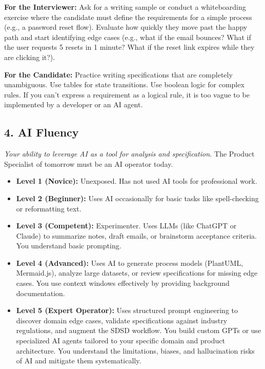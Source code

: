 \documentclass[
  11pt,
  openany,
  oneside]{book}
\providecommand{\tightlist}{%
  \setlength{\itemsep}{0pt}\setlength{\parskip}{0pt}}
\renewenvironment{quote}{\begin{customquote}}{\end{customquote}}
\begin{document}
\begin{quote}
\textbf{For the Interviewer:} Ask for a writing sample or conduct a
whiteboarding exercise where the candidate must define the requirements
for a simple process (e.g., a password reset flow). Evaluate how quickly
they move past the happy path and start identifying edge cases (e.g.,
what if the email bounces? What if the user requests 5 resets in 1
minute? What if the reset link expires while they are clicking it?).
\end{quote}

\begin{quote}
\textbf{For the Candidate:} Practice writing specifications that are
completely unambiguous. Use tables for state transitions. Use boolean
logic for complex rules. If you can't express a requirement as a logical
rule, it is too vague to be implemented by a developer or an AI agent.
\end{quote}

\subsection{4. AI Fluency}\label{ai-fluency}

\emph{Your ability to leverage AI as a tool for analysis and
specification.} The Product Specialist of tomorrow must be an AI
operator today.

\begin{itemize}
\tightlist
\item
  \textbf{Level 1 (Novice):} Unexposed. Has not used AI tools for
  professional work.
\item
  \textbf{Level 2 (Beginner):} Uses AI occasionally for basic tasks like
  spell-checking or reformatting text.
\item
  \textbf{Level 3 (Competent):} Experimenter. Uses LLMs (like ChatGPT or
  Claude) to summarize notes, draft emails, or brainstorm acceptance
  criteria. You understand basic prompting.
\item
  \textbf{Level 4 (Advanced):} Uses AI to generate process models
  (PlantUML, Mermaid.js), analyze large datasets, or review
  specifications for missing edge cases. You use context windows
  effectively by providing background documentation.
\item
  \textbf{Level 5 (Expert Operator):} Uses structured prompt engineering
  to discover domain edge cases, validate specifications against
  industry regulations, and augment the SDSD workflow. You build custom
  GPTs or use specialized AI agents tailored to your specific domain and
  product architecture. You understand the limitations, biases, and
  hallucination risks of AI and mitigate them systematically.
\end{itemize}
\end{document}
